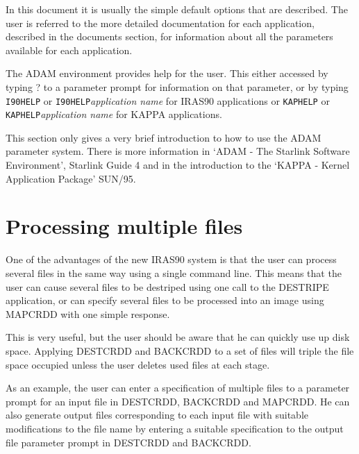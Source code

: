 \documentclass[twoside,11pt]{article}
\newcommand{\xref}[3]{#1}
\newcommand{\xlabel}[1]{}
\begin{document}
In this document it is usually the simple default options that are described.
The user is referred to the more detailed documentation for each application,
described in the documents section, for information about all the parameters
available for each application.

The ADAM environment provides help for the user. This either accessed by typing
? to a parameter prompt for information on that parameter, or by typing
{\tt I90HELP} or {\tt I90HELP}{\it application name} for IRAS90 applications or 
{\tt KAPHELP} or {\tt KAPHELP}{\it application name} for KAPPA applications.

This section only gives a very brief introduction to how to use the ADAM
parameter system. There is more information in `ADAM - The Starlink Software
Environment', Starlink Guide 4 and in the introduction to the `KAPPA - Kernel
Application Package' 
\xref{SUN/95}{sun95}{}.

\section{Processing multiple files
\xlabel{processing_multiple_files}\label{m:promult}}

One of the advantages of the new IRAS90 system is that the user can process
several  files in the same way using a single command line. This means that
the user can cause several files to be destriped using one call to the DESTRIPE
application, or can specify several files to be processed into an image using
MAPCRDD with one simple response.

This is very useful, but the user should be aware that he can quickly use up
disk space. Applying DESTCRDD and BACKCRDD to a set of files will triple the
file space occupied unless the user deletes used files at each stage.

As an example, the user can enter a specification of multiple files to a
parameter prompt for an input file in DESTCRDD, BACKCRDD and MAPCRDD. He can
also generate output files corresponding to each input file with suitable
modifications to the file name by entering a suitable specification to the
output file parameter prompt in DESTCRDD and BACKCRDD.
\end{document}
